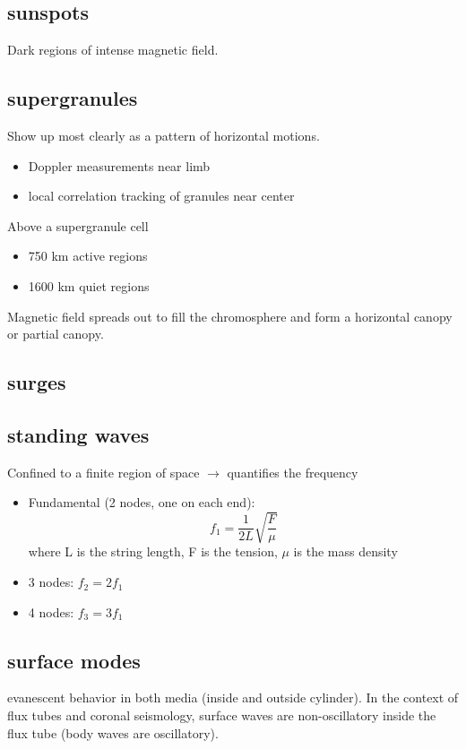 \documentclass{article}
\begin{document}
\subsection{sunspots}
Dark regions of intense magnetic field.

\subsection{supergranules}
Show up most clearly as a pattern of horizontal motions.
\begin{itemize}
    \item Doppler measurements near limb
    \item local correlation tracking of granules near center
\end{itemize}
Above a supergranule cell
\begin{itemize}
    \item 750 km active regions
    \item 1600 km quiet regions
\end{itemize}
Magnetic field spreads out to fill the chromosphere and form a
horizontal canopy or partial canopy.

\subsection{surges}

\subsection{standing waves}
Confined to a finite region of space $\rightarrow$ quantifies the frequency
\begin{itemize}
    \item Fundamental (2 nodes, one on each end):
        $$f_1 = \frac{1}{2L}\sqrt{\frac{F}{\mu}}$$
        where L is the string length, F is the tension, $\mu$ is the mass density
    \item 3 nodes: $f_2 = 2f_1$
    \item 4 nodes: $f_3 = 3f_1$
\end{itemize}


\subsection{surface modes}
evanescent behavior in both media (inside and outside cylinder).
In the context of flux tubes and coronal seismology, surface waves are
non-oscillatory inside the flux tube (body waves are oscillatory).
\end{document}
